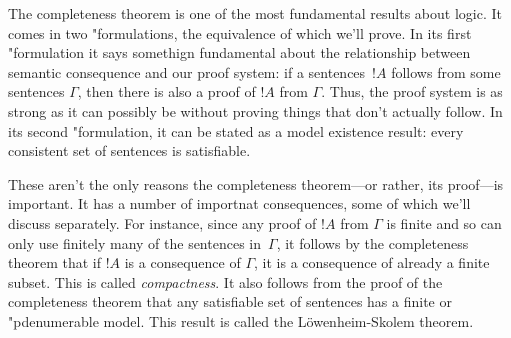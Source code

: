 \documentclass[../../include/open-logic-section]{subfiles}
\begin{document}

The completeness theorem is one of the most fundamental results about
logic.  It comes in two "{formula}tions, the equivalence of which we'll
prove. In its first "{formula}tion it says somethign fundamental about
the relationship between semantic consequence and our proof system: if
a sentences~$!A$ follows from some sentences $\Gamma$, then there is
also a proof of $!A$ from $\Gamma$.  Thus, the proof system is as
strong as it can possibly be without proving things that don't
actually follow.  In its second "{formula}tion, it can be stated as a
model existence result: every consistent set of sentences is
satisfiable.

These aren't the only reasons the completeness theorem---or rather,
its proof---is important. It has a number of importnat consequences,
some of which we'll discuss separately.  For instance, since any proof
of $!A$ from $\Gamma$ is finite and so can only use finitely many of
the sentences in~$\Gamma$, it follows by the completeness theorem that
if $!A$ is a consequence of $\Gamma$, it is a consequence of already a
finite subset.  This is called \emph{compactness}.  It also follows
from the proof of the completeness theorem that any satisfiable set of
sentences has a finite or "p{denumerable} model. This result is called the
L\"owenheim-Skolem theorem.
\end{document}
